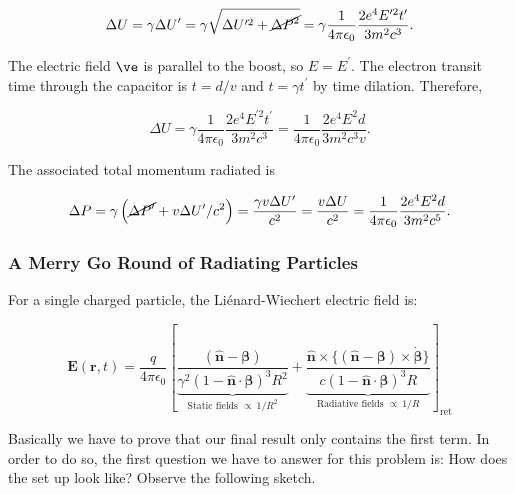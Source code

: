 \begin{equation}
		\Delta U = \gamma \Delta U' = \gamma \sqrt{\Delta U'^{2} + \cancel{\Delta P^{2}}} = \gamma \frac{1}{4 \pi \epsilon_{0}} \frac{2 e^{4} E^{\prime 2} t^{\prime}}{3 m^{2} c^{3}}.
	\end{equation}

The electric field $\ve$ is parallel to the boost, so $E=E^{\prime}$. The electron transit time through the capacitor is $t=d / v$ and $t=\gamma t^{\prime}$ by time dilation. Therefore,

\begin{equation}
	\Delta U=\gamma \frac{1}{4 \pi \epsilon_{0}} \frac{2 e^{4} E^{\prime 2} t^{\prime}}{3 m^{2} c^{3}}=\frac{1}{4 \pi \epsilon_{0}} \frac{2 e^{4} E^{2} d}{3 m^{2} c^{3} v}.
\end{equation}

The associated total momentum radiated is

\begin{equation}
	\Delta P=\gamma\left(\cancel{\Delta P^{\prime}}+v \Delta U^{\prime} / c^{2}\right)=\frac{\gamma v \Delta U^{\prime}}{c^{2}}=\frac{v \Delta U}{c^{2}}=\frac{1}{4 \pi \epsilon_{0}} \frac{2 e^{4} E^{2} d}{3 m^{2} c^{5}}.
\end{equation}

\subsubsection{A Merry Go Round of Radiating Particles}\label{A Merry Go Round of Radiating Particles}

For a single charged particle, the Liénard-Wiechert electric field is:

\begin{equation}
	\mathbf{E}(\mathbf{r}, t)=\frac{q}{4 \pi \epsilon_{0}}\left[\underbrace{\frac{(\hat{\mathbf{n}}-\boldsymbol{\beta})}{\gamma^{2}(1-\hat{\mathbf{n}} \cdot \boldsymbol{\beta})^{3} R^{2}}}_{\text{Static fields $\propto \: 1/R^{2}$}}+\underbrace{\frac{\hat{\mathbf{n}} \times\{(\hat{\mathbf{n}}-\boldsymbol{\beta}) \times \dot{\boldsymbol{\beta}}\}}{c(1-\hat{\mathbf{n}} \cdot \boldsymbol{\beta})^{3} R}}_{\text{Radiative fields $\propto \: 1/R$}}\right]_{\mathrm{ret}}
\end{equation}

Basically we have to prove that our final result only contains the first term. In order to do so, the first question we have to answer for this problem is: How does the set up look like? Observe the following sketch.

